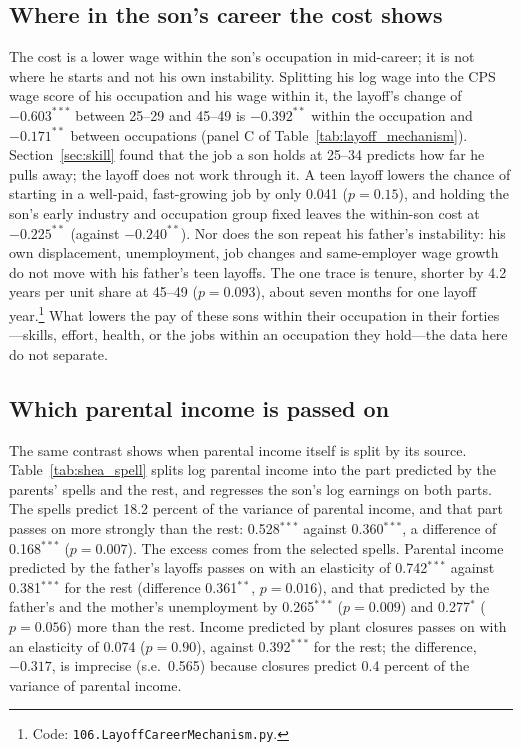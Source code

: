 

\subsection{Where in the son's career the cost shows}

The cost is a lower wage within the son's occupation in mid-career; it is not where he starts and not his own
instability. Splitting his log wage into the CPS wage score of his occupation and his wage within it, the layoff's change
of $-0.603^{***}$ between 25--29 and 45--49 is $-0.392^{**}$ within the occupation and $-0.171^{**}$ between occupations
(panel C of Table~\ref{tab:layoff_mechanism}). Section~\ref{sec:skill} found that the job a son holds at 25--34 predicts
how far he pulls away; the layoff does not work through it. A teen layoff lowers the chance of starting in a well-paid,
fast-growing job by only 0.041 ($p = 0.15$), and holding the son's early industry and occupation group fixed leaves the
within-son cost at $-0.225^{**}$ (against $-0.240^{**}$). Nor does the son repeat his father's instability: his own
displacement, unemployment, job changes and same-employer wage growth do not move with his father's teen layoffs. The one
trace is tenure, shorter by 4.2 years per unit share at 45--49 ($p = 0.093$), about seven months for one layoff
year.\footnote{Code: \texttt{106.LayoffCareerMechanism.py}.} What lowers the pay of these sons within their
occupation in their forties---skills, effort, health, or the jobs within an occupation they hold---the data here do not
separate.




\subsection{Which parental income is passed on}

The same contrast shows when parental income itself is split by its source. Table~\ref{tab:shea_spell} splits log
parental income into the part predicted by the parents' spells and the rest, and regresses the son's log earnings on
both parts. The spells predict 18.2 percent of the variance of parental income, and that part passes on more strongly
than the rest: 0.528$^{***}$ against 0.360$^{***}$, a difference of 0.168$^{***}$ ($p = 0.007$). The excess comes from
the selected spells. Parental income predicted by the father's layoffs passes on with an elasticity of 0.742$^{***}$
against 0.381$^{***}$ for the rest (difference 0.361$^{**}$, $p = 0.016$), and that predicted by the father's and the
mother's unemployment by 0.265$^{***}$ ($p = 0.009$) and 0.277$^{*}$ ($p = 0.056$) more than the rest. Income predicted
by plant closures passes on with an elasticity of 0.074 ($p = 0.90$), against 0.392$^{***}$ for the rest; the difference,
$-0.317$, is imprecise (s.e.\ 0.565) because closures predict 0.4 percent of the variance of parental income.

